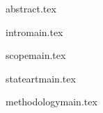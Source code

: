 {abstract.tex}

{intromain.tex}

\pagebreak
{scopemain.tex}

\pagebreak
{stateartmain.tex}

\pagebreak
{methodologymain.tex}